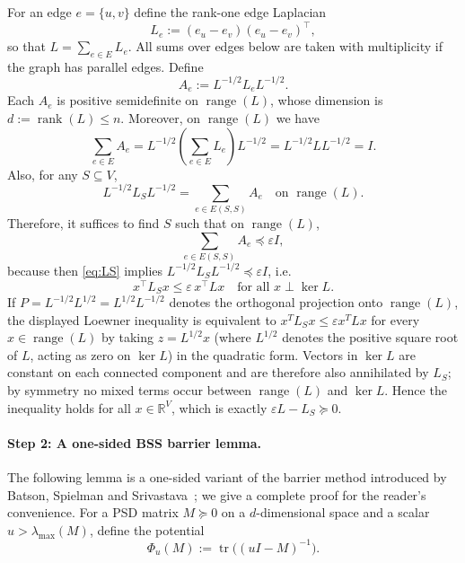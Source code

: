 \documentclass{article}
\begin{document}
For an edge $e = \{u,v\}$ define the rank-one edge Laplacian
\[
  L_e := (e_u - e_v)(e_u - e_v)^\top,
\]
so that $L = \sum_{e \in E} L_e$. All sums over edges below are taken with multiplicity if the
graph has parallel edges. Define
\[
  A_e := L^{-1/2} L_e L^{-1/2}.
\]
Each $A_e$ is positive semidefinite on $\operatorname{range}(L)$, whose dimension is $d := \operatorname{rank}(L) \le n$.
Moreover, on $\operatorname{range}(L)$ we have
\begin{equation}
  \sum_{e \in E} A_e = L^{-1/2}\!\left(\sum_{e \in E} L_e\right)\!L^{-1/2} = L^{-1/2} L L^{-1/2} = I. \label{eq:sum1}
\end{equation}
Also, for any $S \subseteq V$,
\begin{equation}
  L^{-1/2} L_S L^{-1/2} = \sum_{e \in E(S,S)} A_e \quad \text{on } \operatorname{range}(L). \label{eq:LS}
\end{equation}
Therefore, it suffices to find $S$ such that on $\operatorname{range}(L)$,
\begin{equation}
  \sum_{e \in E(S,S)} A_e \preceq \varepsilon I, \label{eq:goal}
\end{equation}
because then \eqref{eq:LS} implies $L^{-1/2} L_S L^{-1/2} \preceq \varepsilon I$, i.e.
\[
  x^\top L_S x \le \varepsilon\, x^\top L x \quad \text{for all } x \perp \ker L.
\]
If $P = L^{-1/2}L^{1/2} = L^{1/2}L^{-1/2}$ denotes the orthogonal projection onto $\operatorname{range}(L)$, the
displayed Loewner inequality is equivalent to $x^T L_S x \le \varepsilon x^T L x$ for every
$x \in \operatorname{range}(L)$ by taking $z = L^{1/2}x$ (where $L^{1/2}$ denotes the positive square root of $L$,
acting as zero on $\ker L$) in the quadratic form. Vectors in $\ker L$ are constant on each
connected component and are therefore also annihilated by $L_S$; by symmetry no mixed terms
occur between $\operatorname{range}(L)$ and $\ker L$. Hence the inequality holds for all $x \in \mathbb{R}^V$, which
is exactly $\varepsilon L - L_S \succeq 0$.

\paragraph{Step 2: A one-sided BSS barrier lemma.}
The following lemma is a one-sided variant of the barrier method introduced by Batson, Spielman
and Srivastava~\cite{BSS}; we give a complete proof for the reader's convenience. For a PSD
matrix $M \succeq 0$ on a $d$-dimensional space and a scalar $u > \lambda_{\max}(M)$, define
the potential
\[
  \Phi_u(M) := \operatorname{tr}\!\bigl((uI - M)^{-1}\bigr).
\]
\end{document}
